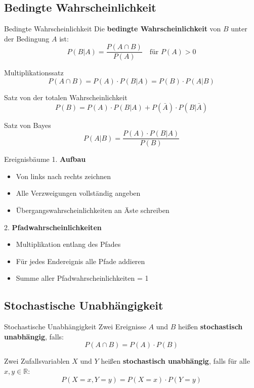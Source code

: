 \subsection{Bedingte Wahrscheinlichkeit}

\begin{definition}{Bedingte Wahrscheinlichkeit}
Die \textbf{bedingte Wahrscheinlichkeit} von $B$ unter der Bedingung $A$ ist:
$$P(B|A) = \frac{P(A \cap B)}{P(A)} \quad \text{für } P(A) > 0$$
\end{definition}

\begin{theorem}{Multiplikationssatz}
$$P(A \cap B) = P(A) \cdot P(B|A) = P(B) \cdot P(A|B)$$
\end{theorem}

\begin{theorem}{Satz von der totalen Wahrscheinlichkeit}
$$P(B) = P(A) \cdot P(B|A) + P(\bar{A}) \cdot P(B|\bar{A})$$
\end{theorem}

\begin{theorem}{Satz von Bayes}
$$P(A|B) = \frac{P(A) \cdot P(B|A)}{P(B)}$$
\end{theorem}

\begin{KR}{Ereignisbäume}
1. \textbf{Aufbau}
   \begin{itemize}
   \item Von links nach rechts zeichnen
   \item Alle Verzweigungen vollständig angeben
   \item Übergangswahrscheinlichkeiten an Äste schreiben
   \end{itemize}

2. \textbf{Pfadwahrscheinlichkeiten}
   \begin{itemize}
   \item Multiplikation entlang des Pfades
   \item Für jedes Endereignis alle Pfade addieren
   \item Summe aller Pfadwahrscheinlichkeiten = 1
   \end{itemize}
\end{KR}

\subsection{Stochastische Unabhängigkeit}

\begin{definition}{Stochastische Unabhängigkeit}
Zwei Ereignisse $A$ und $B$ heißen \textbf{stochastisch unabhängig}, falls:
$$P(A \cap B) = P(A) \cdot P(B)$$

Zwei Zufallsvariablen $X$ und $Y$ heißen \textbf{stochastisch unabhängig}, falls für alle $x,y \in \mathbb{R}$:
$$P(X=x, Y=y) = P(X=x) \cdot P(Y=y)$$
\end{definition}

